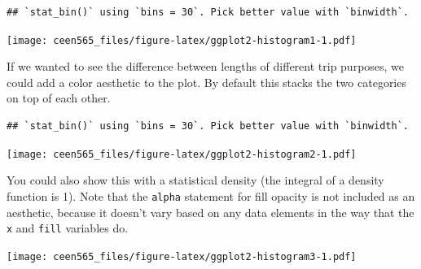 \documentclass[
]{book}
\newenvironment{Shaded}{\begin{snugshade}}{\end{snugshade}}
\newcommand{\DataTypeTok}[1]{\textcolor[rgb]{0.13,0.29,0.53}{#1}}
\newcommand{\DecValTok}[1]{\textcolor[rgb]{0.00,0.00,0.81}{#1}}
\newcommand{\FloatTok}[1]{\textcolor[rgb]{0.00,0.00,0.81}{#1}}
\newcommand{\KeywordTok}[1]{\textcolor[rgb]{0.13,0.29,0.53}{\textbf{#1}}}
\newcommand{\NormalTok}[1]{#1}
\newcommand{\OperatorTok}[1]{\textcolor[rgb]{0.81,0.36,0.00}{\textbf{#1}}}
\newcommand{\StringTok}[1]{\textcolor[rgb]{0.31,0.60,0.02}{#1}}
\begin{document}
\begin{verbatim}
## `stat_bin()` using `bins = 30`. Pick better value with `binwidth`.
\end{verbatim}

\texttt{[image: ceen565\_files/figure-latex/ggplot2-histogram1-1.pdf]}

If we wanted to see the difference between lengths of different trip purposes,
we could add a color aesthetic to the plot. By default this stacks the two
categories on top of each other.

\begin{Shaded}
\end{Shaded}

\begin{verbatim}
## `stat_bin()` using `bins = 30`. Pick better value with `binwidth`.
\end{verbatim}

\texttt{[image: ceen565\_files/figure-latex/ggplot2-histogram2-1.pdf]}

You could also show this with a statistical density (the integral of a density
function is 1). Note that the \texttt{alpha} statement for fill opacity is not included
as an aesthetic, because it doesn't vary based on any data elements in the way that
the \texttt{x} and \texttt{fill} variables do.

\begin{Shaded}
\end{Shaded}

\texttt{[image: ceen565\_files/figure-latex/ggplot2-histogram3-1.pdf]}
\end{document}
